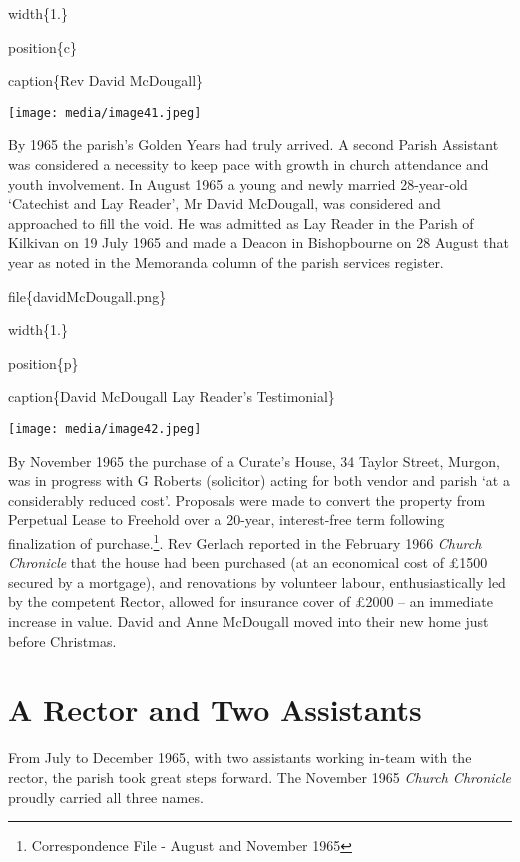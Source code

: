 width\{1.\}

position\{c\}

caption\{Rev David McDougall\}

\texttt{[image: media/image41.jpeg]}

By 1965 the parish's Golden Years had truly arrived. A second Parish Assistant was considered a necessity to keep pace with growth in church attendance and youth involvement. In August 1965 a young and newly married 28-year-old `Catechist and Lay Reader', Mr David McDougall, was considered and approached to fill the void. He was admitted as Lay Reader in the Parish of Kilkivan on 19 July 1965 and made a Deacon in Bishopbourne on 28 August that year as noted in the Memoranda column of the parish services register.

file\{davidMcDougall.png\}

width\{1.\}

position\{p\}

caption\{David McDougall Lay Reader's Testimonial\}

\texttt{[image: media/image42.jpeg]}

By November 1965 the purchase of a Curate's House, 34 Taylor Street, Murgon, was in progress with G Roberts (solicitor) acting for both vendor and parish `at a considerably reduced cost'. Proposals were made to convert the property from Perpetual Lease to Freehold over a 20-year, interest-free term following finalization of purchase.\footnote{Correspondence File - August and November 1965}. Rev Gerlach reported in the February 1966 \emph{Church Chronicle} that the house had been purchased (at an economical cost of £1500 secured by a mortgage), and renovations by volunteer labour, enthusiastically led by the competent Rector, allowed for insurance cover of £2000 -- an immediate increase in value. David and Anne McDougall moved into their new home just before Christmas.

\hypertarget{a-rector-and-two-assistants}{%
\section{A Rector and Two Assistants}\label{a-rector-and-two-assistants}}

From July to December 1965, with two assistants working in-team with the rector, the parish took great steps forward. The November 1965 \emph{Church Chronicle} proudly carried all three names.

